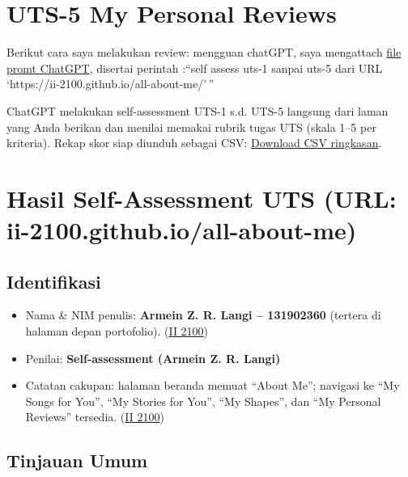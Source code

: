 \documentclass[
  letterpaper,
  DIV=11,
  numbers=noendperiod]{scrreprt}
\providecommand{\tightlist}{%
  \setlength{\itemsep}{0pt}\setlength{\parskip}{0pt}}
\begin{document}

\chapter{UTS-5 My Personal Reviews}\label{uts-5-my-personal-reviews}

Berikut cara saya melakukan review: mengguan chatGPT, saya mengattach
\href{skor_uts.pdf}{file promt ChatGPT}, disertai perintah :``self
assess uts-1 sanpai uts-5 dari URL
`https://ii-2100.github.io/all-about-me/'\,''

ChatGPT melakukan self-assessment UTS-1 s.d. UTS-5 langsung dari laman
yang Anda berikan dan menilai memakai rubrik tugas UTS (skala 1--5 per
kriteria). Rekap skor siap diunduh sebagai CSV:
\href{sandbox:/mnt/data/UTS_self_assessment.csv}{Download CSV
ringkasan}.


\chapter{Hasil Self-Assessment UTS (URL:
ii-2100.github.io/all-about-me)}\label{hasil-self-assessment-uts-url-ii-2100.github.ioall-about-me}

\section{Identifikasi}\label{identifikasi}

\begin{itemize}
\tightlist
\item
  Nama \& NIM penulis: \textbf{Armein Z. R. Langi -- 131902360} (tertera
  di halaman depan portofolio).
  (\href{https://ii-2100.github.io/all-about-me/}{II 2100})
\item
  Penilai: \textbf{Self-assessment (Armein Z. R. Langi)}
\item
  Catatan cakupan: halaman beranda memuat ``About Me''; navigasi ke ``My
  Songs for You'', ``My Stories for You'', ``My Shapes'', dan ``My
  Personal Reviews'' tersedia.
  (\href{https://ii-2100.github.io/all-about-me/}{II 2100})
\end{itemize}

\section{Tinjauan Umum}\label{tinjauan-umum}
\end{document}
